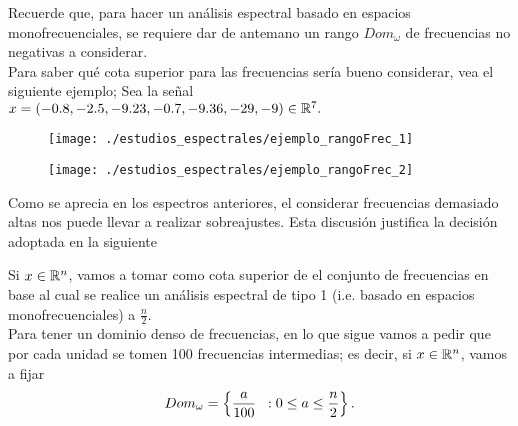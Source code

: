 Recuerde que, para hacer un análisis espectral basado
en espacios monofrecuenciales, se requiere dar de antemano
un rango $Dom_{\omega}$ de frecuencias no negativas a considerar. \\

Para saber qué cota superior para las frecuencias sería bueno considerar,
vea el siguiente ejemplo;
Sea la señal $x =  (-0.8, -2.5,-9.23, -0.7, -9.36, -29, -9) \in \mathbb{R}^{7}.$

\begin{figure}[H]
	\centering
	\texttt{[image: ./estudios\_espectrales/ejemplo\_rangoFrec\_1]} 
\end{figure}	

\begin{figure}[H]
	\centering
	\texttt{[image: ./estudios\_espectrales/ejemplo\_rangoFrec\_2]} 
\end{figure}	

Como se aprecia en los espectros anteriores, el considerar
frecuencias demasiado altas nos puede llevar a realizar sobreajustes.
Esta discusión justifica la decisión adoptada en la siguiente


\begin{nota}
\label{nota: sobre el rango de frecuencias}
Si $x \in \mathbb{R}^{n}$, vamos a tomar como cota superior de
el conjunto de frecuencias en base al cual se realice un análisis
espectral de tipo 1 (i.e. basado en espacios monofrecuenciales)
a $\frac{n}{2}$. \\

Para tener un dominio denso de frecuencias, en lo que sigue 
vamos a pedir que por cada unidad se tomen 100 frecuencias intermedias;
es decir, si $x \in \mathbb{R}^{n}$, vamos a fijar
\[
Dom_{\omega} = \left\{ \frac{a}{100} \hspace{0.2cm} : 0 \leq a \leq \frac{n}{2} \right\}.
\]
\end{nota}
